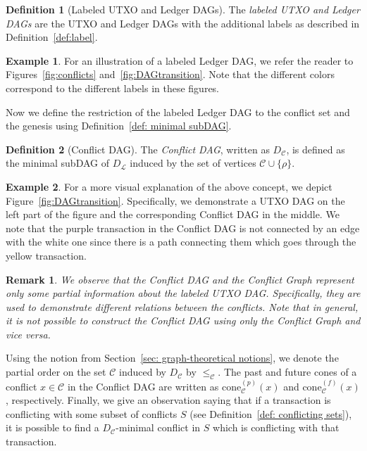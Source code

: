 \documentclass[11pt]{article}
\newcommand{\orig}{\rho}
\newcommand{\conflictset}{\mathcal{C}}
\newcommand{\ledger}{\mathcal{L}}
\newcommand{\LedgerDAG}{D_{\ledger}}
\newcommand{\ConflictDAG}{D_{\conflictset}}
\newcommand{\cone}[3]{\mathrm{cone}_{#2}^{(#1)}\left(#3\right)}
\theoremstyle{plain}
\newtheorem{remark}{Remark}
\theoremstyle{definition}
\newtheorem{definition}{Definition}
\newtheorem{example}{Example}
\numberwithin{definition}{section}
\numberwithin{lemma}{section}
\numberwithin{ass}{section}
\numberwithin{remark}{section}
\numberwithin{example}{section}
\numberwithin{proposition}{section}
\numberwithin{theorem}{section}
\begin{document}
\begin{definition}[Labeled UTXO and Ledger DAGs]\label{def:labeled UTXLedgerDAGs}
The \emph{labeled UTXO and Ledger DAGs} are the UTXO and Ledger DAGs with the  additional labels as described in Definition~\ref{def:label}.
\end{definition}

\begin{example} 
For an illustration of a labeled Ledger DAG, we refer the reader to Figures~\ref{fig:conflicts} and~\ref{fig:DAGtransition}. Note that the different colors correspond to the different labels in these figures. 
\end{example}
Now we define the restriction of the labeled Ledger DAG to the conflict set and the genesis using  Definition~\ref{def: minimal subDAG}.

\begin{definition}[Conflict DAG] \label{def: Conflict DAG}
The \emph{Conflict DAG}, written as $\ConflictDAG$, is defined as the minimal subDAG of $\LedgerDAG$ induced by the set of vertices $\conflictset\cup \{\orig\}$. 
\end{definition}

\begin{example}
For a more visual explanation of the above concept, we depict Figure~\ref{fig:DAGtransition}. Specifically, we demonstrate a UTXO DAG on the left part of the figure and the corresponding Conflict DAG in the middle. We note that the purple transaction in the Conflict DAG is not connected by an edge with the white one since there is a path connecting them which goes through the yellow transaction.
\end{example}
\begin{remark}
We observe that the Conflict DAG and the Conflict Graph represent only some partial information about the labeled UTXO DAG. Specifically, they are used to demonstrate different relations between the conflicts. Note that in general, it is not possible to construct the Conflict DAG using only the Conflict Graph and vice versa.
\end{remark}

Using the notion from Section~\ref{sec: graph-theoretical notions}, we denote the partial order on the set $\conflictset$ induced by $\ConflictDAG$ by $\le_{\conflictset}$. The past and future cones of a conflict $x\in\conflictset$ in the Conflict DAG are written as  $\cone{p}{\conflictset}{x}$ and $\cone{f}{\conflictset}{x}$, respectively. Finally, we give an observation saying that if a transaction is conflicting with some subset of conflicts $S$ (see Definition~\ref{def: conflicting sets}), it is possible to find a $\ConflictDAG$-minimal conflict in $S$ which is conflicting with that transaction.
\end{document}
